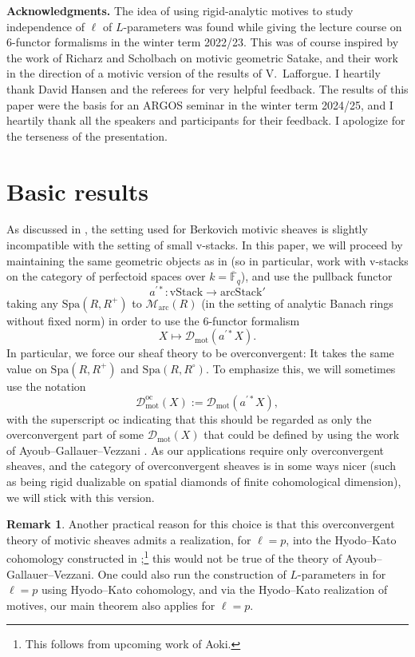 \documentclass[11pt]{amsart}
\numberwithin{equation}{section}
\numberwithin{theorem}{section}
\theoremstyle{definition}
\newtheorem{remark}[theorem]{Remark}
\newcommand{\Spa}{\mathrm{Spa}}
\begin{document}
{\bf Acknowledgments.} The idea of using rigid-analytic motives to study independence of $\ell$ of $L$-parameters was found while giving the lecture course \cite{ScholzeSixFunctors} on $6$-functor formalisms in the winter term 2022/23. This was of course inspired by the work of Richarz and Scholbach on motivic geometric Satake, and their work in the direction of a motivic version of the results of V.~Lafforgue. I heartily thank David Hansen and the referees for very helpful feedback. The results of this paper were the basis for an ARGOS seminar in the winter term 2024/25, and I heartily thank all the speakers and participants for their feedback. I apologize for the terseness of the presentation.

\section{Basic results}

As discussed in \cite[Section 12]{BerkovichMotives}, the setting used for Berkovich motivic sheaves is slightly incompatible with the setting of small v-stacks. In this paper, we will proceed by maintaining the same geometric objects as in \cite{FarguesScholze} (so in particular, work with v-stacks on the category of perfectoid spaces over $k=\overline{\mathbb F}_q$), and use the pullback functor
\[
a^{\prime\ast}: \mathrm{vStack}\to \mathrm{arcStack}'
\]
taking any $\mathrm{Spa}(R,R^+)$ to $\mathcal M_{\mathrm{arc}}(R)$ (in the setting of analytic Banach rings without fixed norm) in order to use the $6$-functor formalism
\[
X\mapsto \mathcal D_{\mathrm{mot}}(a^{\prime\ast} X).
\]
In particular, we force our sheaf theory to be overconvergent: It takes the same value on $\Spa(R,R^+)$ and $\Spa(R,R^\circ)$. To emphasize this, we will sometimes use the notation
\[
\mathcal D_{\mathrm{mot}}^{\mathrm{oc}}(X) := \mathcal D_{\mathrm{mot}}(a^{\prime\ast} X),
\]
with the superscript $\mathrm{oc}$ indicating that this should be regarded as only the overconvergent part of some $\mathcal D_{\mathrm{mot}}(X)$ that could be defined by using the work of Ayoub--Gallauer--Vezzani \cite{AyoubGallauerVezzani}. As our applications require only overconvergent sheaves, and the category of overconvergent sheaves is in some ways nicer (such as being rigid dualizable on spatial diamonds of finite cohomological dimension), we will stick with this version.

\begin{remark} Another practical reason for this choice is that this overconvergent theory of motivic sheaves admits a realization, for $\ell=p$, into the Hyodo--Kato cohomology constructed in \cite{DeRhamFarguesFontaine};\footnote{This follows from upcoming work of Aoki.} this would not be true of the theory of Ayoub--Gallauer--Vezzani. One could also run the construction of $L$-parameters in \cite{FarguesScholze} for $\ell=p$ using Hyodo--Kato cohomology, and via the Hyodo--Kato realization of motives, our main theorem also applies for $\ell=p$.
\end{remark}
\end{document}
